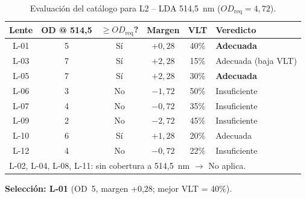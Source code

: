 \documentclass[12pt,a4paper]{article}
\begin{document}
\begin{table}[H]
	\centering
	\caption{Evaluación del catálogo para L2 -- LDA 514,5~nm ($OD_{\mathrm{req}} = 4{,}72$).}
	\label{tab:eval_L2}
	\small
	\begin{tabular}{c c c c c l}
		\toprule
		\textbf{Lente} & \textbf{OD @ 514,5} & \textbf{$\ge OD_{\mathrm{req}}$?}
		               & \textbf{Margen}     & \textbf{VLT}                      & \textbf{Veredicto}                                                     \\
		\midrule
		\rowcolor{aerogreen!15}
		L-01           & 5                   & Sí                                & $+0{,}28$          & 40\% & \textcolor{aerogreen}{\textbf{Adecuada}}   \\
		L-03           & 7                   & Sí                                & $+2{,}28$          & 15\% & \textcolor{aerogreen}{Adecuada (baja VLT)} \\
		\rowcolor{aerogreen!15}
		L-05           & 7                   & Sí                                & $+2{,}28$          & 30\% & \textcolor{aerogreen}{\textbf{Adecuada}}   \\
		L-06           & 3                   & No                                & $-1{,}72$          & 50\% & \textcolor{aerored}{Insuficiente}          \\
		L-07           & 4                   & No                                & $-0{,}72$          & 35\% & \textcolor{aerored}{Insuficiente}          \\
		L-09           & 2                   & No                                & $-2{,}72$          & 45\% & \textcolor{aerored}{Insuficiente}          \\
		\rowcolor{aerogreen!15}
		L-10           & 6                   & Sí                                & $+1{,}28$          & 20\% & \textcolor{aerogreen}{Adecuada}            \\
		L-12           & 4                   & No                                & $-0{,}72$          & 22\% & \textcolor{aerored}{Insuficiente}          \\
		\midrule
		\multicolumn{6}{l}{\footnotesize L-02, L-04, L-08, L-11: sin cobertura a 514,5~nm $\rightarrow$ \textcolor{aerored}{No aplica}.}                  \\
		\bottomrule
	\end{tabular}
\end{table}

\textbf{Selección: L-01} (OD~5, margen +0,28; mejor VLT = 40\%).
\end{document}

